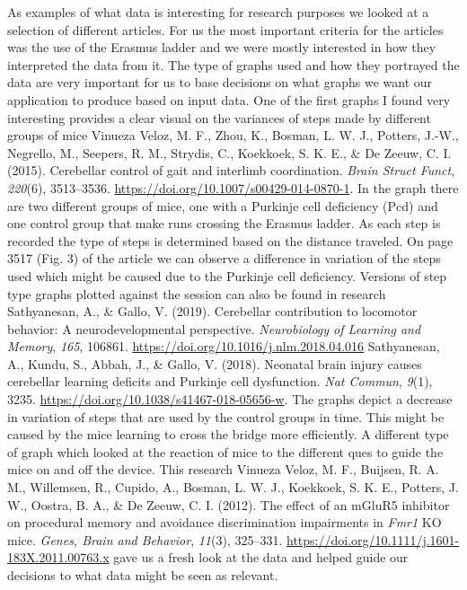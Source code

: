 \documentclass[11pt,a4paper,]{awesome-cv}
\begin{document}
As examples of what data is interesting for research purposes we looked
at a selection of different articles. For us the most important criteria
for the articles was the use of the Erasmus ladder and we were mostly
interested in how they interpreted the data from it. The type of graphs
used and how they portrayed the data are very important for us to base
decisions on what graphs we want our application to produce based on
input data. One of the first graphs I found very interesting provides a
clear visual on the variances of steps made by different groups of mice
Vinueza Veloz, M. F., Zhou, K., Bosman, L. W. J., Potters, J.-W.,
Negrello, M., Seepers, R. M., Strydis, C., Koekkoek, S. K. E., \& De
Zeeuw, C. I. (2015). Cerebellar control of gait and interlimb
coordination. \emph{Brain Struct Funct}, \emph{220}(6), 3513--3536.
\url{https://doi.org/10.1007/s00429-014-0870-1}. In the graph there are
two different groups of mice, one with a Purkinje cell deficiency (Pcd)
and one control group that make runs crossing the Erasmus ladder. As
each step is recorded the type of steps is determined based on the
distance traveled. On page 3517 (Fig. 3) of the article we can observe a
difference in variation of the steps used which might be caused due to
the Purkinje cell deficiency. Versions of step type graphs plotted
against the session can also be found in research Sathyanesan, A., \&
Gallo, V. (2019). Cerebellar contribution to locomotor behavior: {A}
neurodevelopmental perspective. \emph{Neurobiology of Learning and
Memory}, \emph{165}, 106861.
\url{https://doi.org/10.1016/j.nlm.2018.04.016} Sathyanesan, A., Kundu,
S., Abbah, J., \& Gallo, V. (2018). Neonatal brain injury causes
cerebellar learning deficits and {Purkinje} cell dysfunction. \emph{Nat
Commun}, \emph{9}(1), 3235.
\url{https://doi.org/10.1038/s41467-018-05656-w}. The graphs depict a
decrease in variation of steps that are used by the control groups in
time. This might be caused by the mice learning to cross the bridge more
efficiently. A different type of graph which looked at the reaction of
mice to the different ques to guide the mice on and off the device. This
research Vinueza Veloz, M. F., Buijsen, R. A. M., Willemsen, R., Cupido,
A., Bosman, L. W. J., Koekkoek, S. K. E., Potters, J. W., Oostra, B. A.,
\& De Zeeuw, C. I. (2012). The effect of an {mGluR5} inhibitor on
procedural memory and avoidance discrimination impairments in
{\emph{Fmr1}} {KO} mice. \emph{Genes, Brain and Behavior}, \emph{11}(3),
325--331. \url{https://doi.org/10.1111/j.1601-183X.2011.00763.x} gave us
a fresh look at the data and helped guide our decisions to what data
might be seen as relevant.
\end{document}
